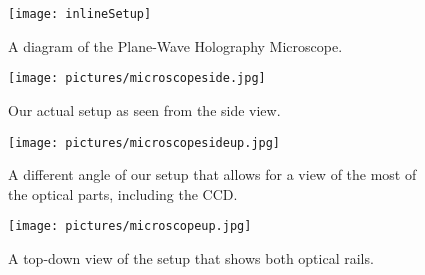 \begin{figure}[htbp!]
\begin{center}
    \texttt{[image: inlineSetup]}
\end{center}
\caption{A diagram of the Plane-Wave Holography Microscope.}
\label{fig:inlineSetup}
\end{figure}


\begin{figure}[htbp!]
\begin{center}
    \texttt{[image: pictures/microscopeside.jpg]}
\end{center}
\caption{Our actual setup as seen from the side view.}
\label{fig:OurMicroscopeSide}
\end{figure}

\begin{figure}[htbp!]
\begin{center}
    \texttt{[image: pictures/microscopesideup.jpg]}
\end{center}
\caption{A different angle of our setup that allows for a view of the most of
    the optical parts, including the CCD.}
\label{fig:OurMicroscopeSideUp}
\end{figure}

\begin{figure}[htbp!]
\begin{center}
    \texttt{[image: pictures/microscopeup.jpg]}
\end{center}
\caption{A top-down view of the setup that shows both optical rails.}
\label{fig:OurMicroscopeUp}
\end{figure}

